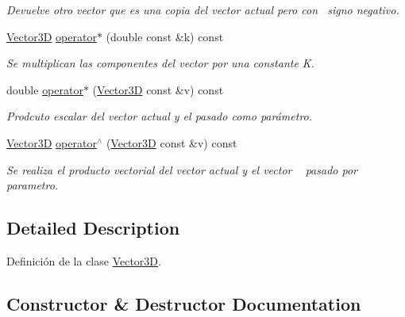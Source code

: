 \begin{Indent}
\begin{DoxyCompactItemize}
\begin{DoxyCompactList}\small\item\em Devuelve otro vector que es una copia del vector actual pero con~\newline
 signo negativo. \end{DoxyCompactList}\item 
\mbox{\hyperlink{classed_1_1Vector3D}{Vector3D}} \mbox{\hyperlink{classed_1_1Vector3D_a9eb8e6b92c903d0e14dc986fe36b4e26}{operator$\ast$}} (double const \&k) const
\begin{DoxyCompactList}\small\item\em Se multiplican las componentes del vector por una constante K. \end{DoxyCompactList}\item 
double \mbox{\hyperlink{classed_1_1Vector3D_ac68f544bb9dccf1957276751eb9b22ef}{operator$\ast$}} (\mbox{\hyperlink{classed_1_1Vector3D}{Vector3D}} const \&v) const
\begin{DoxyCompactList}\small\item\em Prodcuto escalar del vector actual y el pasado como parámetro. \end{DoxyCompactList}\item 
\mbox{\hyperlink{classed_1_1Vector3D}{Vector3D}} \mbox{\hyperlink{classed_1_1Vector3D_a4c38081a03f4294dbfa3aee531fe5a73}{operator$^\wedge$}} (\mbox{\hyperlink{classed_1_1Vector3D}{Vector3D}} const \&v) const
\begin{DoxyCompactList}\small\item\em Se realiza el producto vectorial del vector actual y el vector ~\newline
 pasado por parametro. \end{DoxyCompactList}\end{DoxyCompactItemize}
\end{Indent}


\subsection{Detailed Description}
Definición de la clase \mbox{\hyperlink{classed_1_1Vector3D}{Vector3D}}. 

\subsection{Constructor \& Destructor Documentation}
\mbox{\label{classed_1_1Vector3D_a6747bbbfd5d1fac542e46315aed209e5}} 
